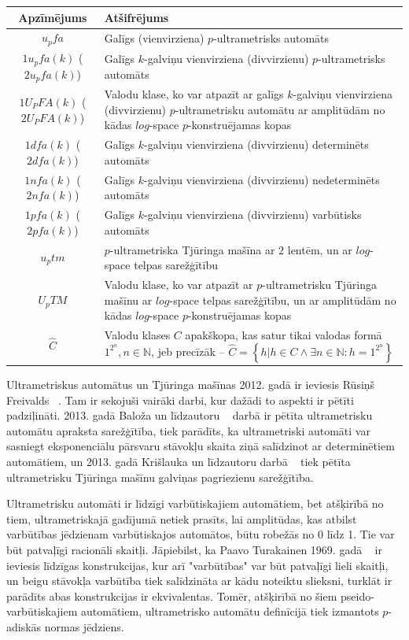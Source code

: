 \documentclass{ludis}
\begin{document}
\setlength\LTleft{0pt}
\setlength\LTright{0pt}
\begin{longtable}{| c | p{28em} |}
  \hline
  \textbf{Apzīmējums} & \textbf{Atšifrējums}\\ 
  \endhead

  \hline
  $u_pfa$ & Galīgs (vienvirziena) $p$-ultrametrisks automāts\\
  $1u_pfa(k)$ ($2u_pfa(k)$) &  Galīgs $k$-galviņu vienvirziena (divvirzienu) $p$-ultrametrisks automāts\\
  $1U_PFA(k)$ ($2U_PFA(k)$) &  Valodu klase, ko var atpazīt ar galīgs $k$-galviņu vienvirziena (divvirzienu) $p$-ultrametrisku automātu ar amplitūdām no kādas $log$-space $p$-konstruējamas kopas\\
  $1dfa(k)$ ($2dfa(k)$) &  Galīgs $k$-galviņu vienvirziena (divvirzienu) determinēts automāts\\
  $1nfa(k)$ ($2nfa(k)$) &  Galīgs $k$-galviņu vienvirziena (divvirzienu) nedeterminēts automāts\\
  $1pfa(k)$ ($2pfa(k)$) &  Galīgs $k$-galviņu vienvirziena (divvirzienu) varbūtisks automāts\\
  $u_ptm$ &  $p$-ultrametriska Tjūringa mašīna ar $2$ lentēm, un ar $log$-space telpas sarežģītību\\
  $U_pTM$ &  Valodu klase, ko var atpazīt ar $p$-ultrametrisku Tjūringa mašīnu ar $log$-space telpas sarežģītību, un ar amplitūdām no kādas $log$-space $p$-konstruējamas kopas\\
  $\widehat{C}$ & Valodu klases $C$ apakškopa, kas satur tikai valodas formā $1^{2^n}, n \in \mathbb{N}$, jeb precīzāk -- $\widehat{C} = \left\{ h | h \in C \wedge \exists n \in \mathbb{N} : h = 1^{2^n} \right\}$\\
  \hline
\end{longtable}

Ultrametriskus automātus un Tjūringa mašīnas 2012. gadā ir ieviesis Rūsiņš Freivalds ~\citep{Freivalds2012}. Tam ir sekojuši vairāki darbi, kur dažādi to aspekti ir pētīti padziļināti. 2013. gadā Baloža un līdzautoru ~\citep{KasparsBalodis2013} darbā ir pētīta ultrametrisku automātu apraksta sarežģītība,
tiek parādīts, ka ultrametriski automāti var sasniegt eksponenciālu pārsvaru stāvokļu skaita ziņā salīdzinot ar determinētiem automātiem, un 2013. gadā Krišlauka un līdzautoru darbā ~\citep{Krislauks2013} tiek pētīta ultrametrisku Tjūringa mašīnu galviņas pagriezienu sarežģītība.

Ultrametrisku automāti ir līdzīgi varbūtiskajiem automātiem, bet atšķirībā no tiem, ultrametriskajā gadījumā netiek prasīts, lai amplitūdas, kas atbilst varbūtības jēdzienam varbūtiskajos automātos, būtu robežās no 0 līdz 1. Tie var būt patvaļīgi racionāli skaitļi. Jāpiebilst, ka Paavo Turakainen 1969. gadā ~\citep{Turakainen1969} ir ieviesis līdzīgas konstrukcijas, kur arī "varbūtības" var būt patvaļīgi lieli skaitļi, un beigu stāvokļa varbūtība tiek salīdzināta ar kādu noteiktu slieksni, turklāt ir parādīts abas konstrukcijas ir ekvivalentas. Tomēr, atšķirībā no šiem pseido-varbūtiskajiem automātiem, ultrametrisko automātu definīcijā tiek izmantots $p$-adiskās normas jēdziens.
\end{document}
